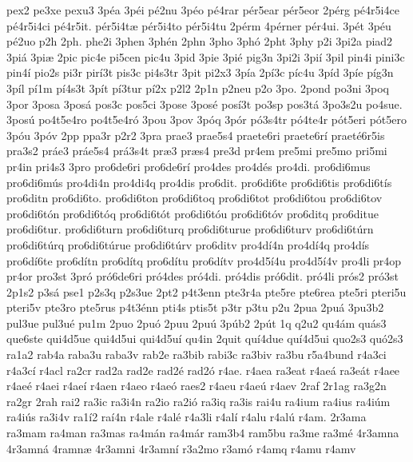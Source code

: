 {pex2
pe3xe
pexu3
3p^^e9a
3p^^e9i
p^^e92nu
3p^^e9o
p^^e94rar
p^^e9r5ear
p^^e9r5eor
2p^^e9rg
p^^e94r5i4ce
p^^e94r5i4ci
p^^e94r5it.
p^^e9r5i4t^^e6
p^^e9r5i4to
p^^e9r5i4tu
2p^^e9rm
4p^^e9rner
p^^e9r4ui.
3p^^e9t
3p^^e9u
p^^e92uo
p2h
2ph.
phe2i
3phen
3ph^^e9n
2phn
3pho
3ph^^f3
2pht
3phy
p2i
3pi2a
piad2
3pi^^e1
3pi^^e6
2pic
pic4e
pi5cen
pic4u
3pid
3pie
3pi^^e9
pig3n
3pi2i
3pi^^ed
3pil
pin4i
pini3c
pin4^^ed
pio2s
pi3r
pir^^ed3t
pis3c
pi4s3tr
3pit
pi2x3
3p^^eda
2p^^ed3c
p^^edc4u
3p^^edd
3p^^ede
p^^edg3n
3p^^edl
p^^ed1m
p^^ed4s3t
3p^^edt
p^^ed3tur
p^^ed2x
p2l2
2p1n
p2neu
p2o
3po.
2pond
po3ni
3poq
3por
3posa
3pos^^e1
pos3c
pos5ci
3pose
3pos^^e9
pos^^ed3t
po3sp
pos3t^^e1
3po3s2u
po4sue.
3pos^^fa
po4t5e4ro
po4t5e4r^^f3
3pou
3pov
3p^^f3q
3p^^f3r
p^^f33s4tr
p^^f34te4r
p^^f3t5eri
p^^f3t5ero
3p^^f3u
3p^^f3v
2pp
ppa3r
p2r2
3pra
prae3
prae5s4
praete6ri
praete6r^^ed
praet^^e96r5is
pra3s2
pr^^e1e3
pr^^e1e5s4
pr^^e13s4t
pr^^e63
pr^^e6s4
pre3d
pr4em
pre5mi
pre5mo
pri5mi
pr4in
pri4s3
3pro
pro6de6ri
pro6de6r^^ed
pro4des
pro4d^^e9s
pro4di.
pro6di6mus
pro6di6m^^fas
pro4di4n
pro4di4q
pro4dis
pro6dit.
pro6di6te
pro6di6tis
pro6di6t^^eds
pro6ditn
pro6di6to.
pro6di6ton
pro6di6toq
pro6di6tot
pro6di6tou
pro6di6tov
pro6di6t^^f3n
pro6di6t^^f3q
pro6di6t^^f3t
pro6di6t^^f3u
pro6di6t^^f3v
pro6ditq
pro6ditue
pro6di6tur.
pro6di6turn
pro6di6turq
pro6di6turue
pro6di6turv
pro6di6t^^farn
pro6di6t^^farq
pro6di6t^^farue
pro6di6t^^farv
pro6ditv
pro4d^^ed4n
pro4d^^ed4q
pro4d^^eds
pro6d^^ed6te
pro6d^^edtn
pro6d^^edtq
pro6d^^edtu
pro6d^^edtv
pro4d5^^ed4u
pro4d5^^ed4v
pro4li
pr4op
pr4or
pro3st
3pr^^f3
pr^^f36de6ri
pr^^f34des
pr^^f34di.
pr^^f34dis
pr^^f36dit.
pr^^f34li
pr^^f3s2
pr^^f33st
2p1s2
p3s^^e1
pse1
p2s3q
p2s3ue
2pt2
p4t3enn
pte3r4a
pte5re
pte6rea
pte5ri
pteri5u
pteri5v
pte3ro
pte5rus
p4t3^^e9nn
pti4s
ptis5t
p3tr
p3tu
p2u
2pua
2pu^^e1
3pu3b2
pul3ue
pul3u^^e9
pu1m
2puo
2pu^^f3
2puu
2pu^^fa
3p^^fab2
2p^^fat
1q
q2u2
qu4^^e1m
qu^^e1s3
que6ste
qui4d5ue
qui4d5ui
qui4d5u^^ed
qu4in
2quit
qu^^ed4due
qu^^ed4d5ui
quo2s3
qu^^f32s3
ra1a2
rab4a
raba3u
raba3v
rab2e
ra3bib
rabi3c
ra3biv
ra3bu
r5a4bund
r4a3ci
r4a3c^^ed
r4acl
ra2cr
rad2a
rad2e
rad2^^e9
rad2^^f3
r4ae.
r4aea
ra3eat
r4ae^^e1
ra3e^^e1t
r4aee
r4ae^^e9
r4aei
r4ae^^ed
r4aen
r4aeo
r4ae^^f3
raes2
r4aeu
r4ae^^fa
r4aev
2raf
2r1ag
ra3g2n
ra2gr
2rah
rai2
ra3ic
ra3i4n
ra2io
ra2i^^f3
ra3iq
ra3is
rai4u
ra4ium
ra4ius
ra4i^^fam
ra4i^^fas
ra3i4v
ra1^^ed2
ra^^ed4n
r4ale
r4al^^e9
r4a3li
r4al^^ed
r4alu
r4al^^fa
r4am.
2r3ama
ra3mam
ra4man
ra3mas
ra4m^^e1n
ra4m^^e1r
ram3b4
ram5bu
ra3me
ra3m^^e9
4r3amna
4r3amn^^e1
4ramn^^e6
4r3amni
4r3amn^^ed
r3a2mo
r3am^^f3
r4amq
r4amu
r4amv
}
